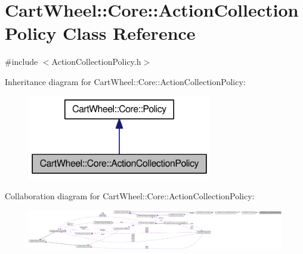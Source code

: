\hypertarget{classCartWheel_1_1Core_1_1ActionCollectionPolicy}{
\section{CartWheel::Core::ActionCollectionPolicy Class Reference}
\label{classCartWheel_1_1Core_1_1ActionCollectionPolicy}
}


{\ttfamily \#include $<$ActionCollectionPolicy.h$>$}



Inheritance diagram for CartWheel::Core::ActionCollectionPolicy:\nopagebreak
\begin{figure}[H]
\begin{center}
\leavevmode
\includegraphics[width=228pt]{classCartWheel_1_1Core_1_1ActionCollectionPolicy__inherit__graph}
\end{center}
\end{figure}


Collaboration diagram for CartWheel::Core::ActionCollectionPolicy:\nopagebreak
\begin{figure}[H]
\begin{center}
\leavevmode
\includegraphics[width=400pt]{classCartWheel_1_1Core_1_1ActionCollectionPolicy__coll__graph}
\end{center}
\end{figure}
